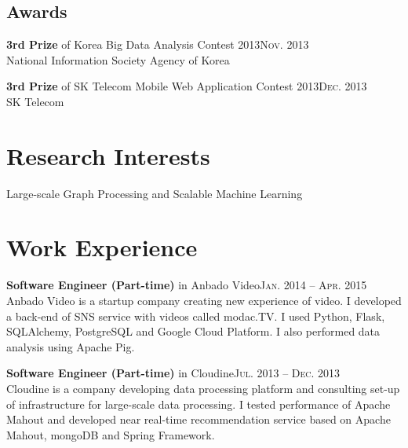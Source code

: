 \documentclass[11pt,a4paper]{article}
\renewenvironment{itemize}{
  \begin{list}{}{
    \setlength{\leftmargin}{1.5em}
    \setlength{\itemsep}{0.5em}
    \setlength{\parskip}{0pt}
    \setlength{\parsep}{0.25em}
  }
}{
  \end{list}
}
\begin{document}
\subsection*{Awards}
\begin{itemize}
  \item \textbf{3rd Prize} of Korea Big Data Analysis Contest 2013\hfill\textsc{Nov. 2013}\\
        National Information Society Agency of Korea
  \item \textbf{3rd Prize} of SK Telecom Mobile Web Application Contest 2013\hfill\textsc{Dec. 2013}\\
        SK Telecom
\end{itemize}

\section*{Research Interests}
\begin{itemize}
  \item Large-scale Graph Processing and Scalable Machine Learning
\end{itemize}

\section*{Work Experience}
\begin{itemize}
  \item \textbf{Software Engineer (Part-time)} in Anbado Video\hfill\textsc{Jan. 2014 -- Apr. 2015}\\
        Anbado Video is a startup company creating new experience of video. I developed a back-end of SNS service with videos called modac.TV. I used Python, Flask, SQLAlchemy, PostgreSQL and Google Cloud Platform. I also performed data analysis using Apache Pig.
  \item \textbf{Software Engineer (Part-time)} in Cloudine\hfill\textsc{Jul. 2013 -- Dec. 2013}\\
        Cloudine is a company developing data processing platform and consulting set-up of infrastructure for large-scale data processing. I tested performance of Apache Mahout and developed near real-time recommendation service based on Apache Mahout, mongoDB and Spring Framework.
\end{itemize}

\end{document}
